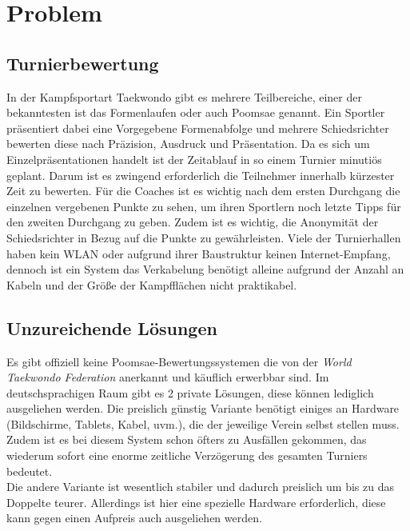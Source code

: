 \section{Problem}
\subsection{Turnierbewertung}
In der Kampfsportart Taekwondo gibt es mehrere Teilbereiche, einer der bekanntesten ist das Formenlaufen oder auch Poomsae genannt.
Ein Sportler präsentiert dabei eine Vorgegebene Formenabfolge und mehrere Schiedsrichter bewerten diese nach Präzision, Ausdruck und Präsentation.
Da es sich um Einzelpräsentationen handelt ist der Zeitablauf in so einem Turnier minutiös geplant.
Darum ist es zwingend erforderlich die Teilnehmer innerhalb kürzester Zeit zu bewerten.
Für die Coaches ist es wichtig nach dem ersten Durchgang die einzelnen vergebenen Punkte zu sehen, um ihren Sportlern noch letzte Tipps für den zweiten Durchgang zu geben.
Zudem ist es wichtig, die Anonymität der Schiedsrichter in Bezug auf die Punkte zu gewährleisten.
Viele der Turnierhallen haben kein WLAN oder aufgrund ihrer Baustruktur keinen Internet-Empfang, dennoch ist ein System
das Verkabelung benötigt alleine aufgrund der Anzahl an Kabeln und der Größe der Kampfflächen nicht praktikabel.
	
\subsection{Unzureichende Lösungen}
Es gibt offiziell keine Poomsae-Bewertungssystemen die von der \emph{World Taekwondo Federation} anerkannt und käuflich erwerbbar sind.
Im deutschsprachigen Raum gibt es 2 private Lösungen, diese können lediglich ausgeliehen werden.
Die preislich günstig Variante benötigt einiges an Hardware (Bildschirme, Tablets, Kabel, uvm.), die der jeweilige Verein selbst stellen muss.
Zudem ist es bei diesem System schon öfters zu Ausfällen gekommen, das wiederum sofort eine enorme zeitliche Verzögerung des gesamten Turniers bedeutet.
\\
Die andere Variante ist wesentlich stabiler und dadurch preislich um bis zu das Doppelte teurer.
Allerdings ist hier eine spezielle Hardware erforderlich, diese kann gegen einen Aufpreis auch ausgeliehen werden.

